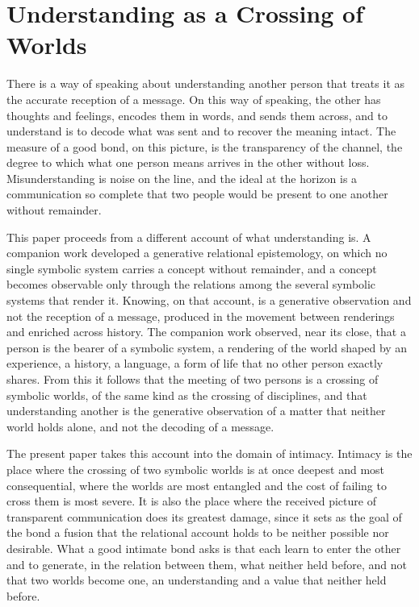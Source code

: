 \section{Understanding as a Crossing of Worlds}
\label{p27:sec:intro}

\noindent
There is a way of speaking about understanding another person that treats it as the accurate reception of a message. On this way of speaking, the other has thoughts and feelings, encodes them in words, and sends them across, and to understand is to decode what was sent and to recover the meaning intact. The measure of a good bond, on this picture, is the transparency of the channel, the degree to which what one person means arrives in the other without loss. Misunderstanding is noise on the line, and the ideal at the horizon is a communication so complete that two people would be present to one another without remainder.

This paper proceeds from a different account of what understanding is. A companion work developed a generative relational epistemology, on which no single symbolic system carries a concept without remainder, and a concept becomes observable only through the relations among the several symbolic systems that render it. Knowing, on that account, is a generative observation and not the reception of a message, produced in the movement between renderings and enriched across history. The companion work observed, near its close, that a person is the bearer of a symbolic system, a rendering of the world shaped by an experience, a history, a language, a form of life that no other person exactly shares. From this it follows that the meeting of two persons is a crossing of symbolic worlds, of the same kind as the crossing of disciplines, and that understanding another is the generative observation of a matter that neither world holds alone, and not the decoding of a message.

The present paper takes this account into the domain of intimacy. Intimacy is the place where the crossing of two symbolic worlds is at once deepest and most consequential, where the worlds are most entangled and the cost of failing to cross them is most severe. It is also the place where the received picture of transparent communication does its greatest damage, since it sets as the goal of the bond a fusion that the relational account holds to be neither possible nor desirable. What a good intimate bond asks is that each learn to enter the other and to generate, in the relation between them, what neither held before, and not that two worlds become one, an understanding and a value that neither held before.

